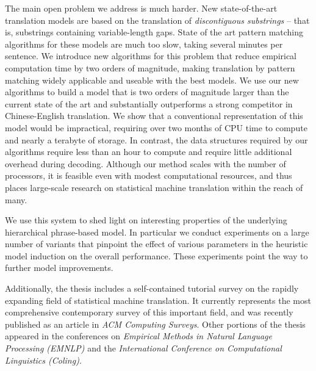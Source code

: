 \documentclass[11pt]{thesis-2}  %
\begin{document}
	The main open problem we address is much harder.  New state-of-the-art translation models
	are based on the translation of {\em discontiguous substrings} -- that is, substrings
	containing variable-length gaps.  State of the art pattern
	matching algorithms for these models are much too slow, taking several minutes
	per sentence.  We introduce new algorithms for this problem that reduce empirical 
	computation time by two orders of magnitude, making translation by
	pattern matching widely applicable and useable with the best models. 
	We use our new algorithms to build a
	model that is two orders of magnitude larger than the current state of the
	art and substantially outperforms a strong competitor in Chinese-English
	translation.  We show that a conventional representation of this model would
	be impractical, requiring over two months of CPU time to compute and nearly
	a terabyte of storage.  In contrast, the data structures required by our 
	algorithms require less than an hour to compute and require little additional
	overhead during decoding.  Although our method scales with the number of 
	processors, it is feasible even with modest computational resources, and thus
	places large-scale research on statistical machine translation within the
	reach of many.
	
	We use this system to shed light on interesting properties
	of the underlying hierarchical phrase-based model.  In particular we conduct
	experiments on a large number of variants that pinpoint the effect of various
	parameters in the heuristic model induction on the overall performance.  These
	experiments point the way to further model improvements.
	
	Additionally, the thesis includes a self-contained tutorial survey
	on the rapidly expanding field of statistical machine translation.  It currently
	represents the most comprehensive contemporary survey of this important field,
	and was recently published as an article in {\em ACM Computing Surveys}.
	Other portions of the thesis appeared in the conferences on 
	{\em Empirical Methods in Natural Language Processing (EMNLP)} and the {\em International
	Conference on Computational Linguistics (Coling)}.
	
\end{document}
